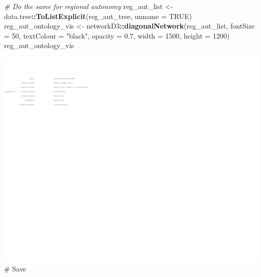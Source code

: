 \documentclass[
]{article}
\newenvironment{Shaded}{\begin{snugshade}}{\end{snugshade}}
\newcommand{\CommentTok}[1]{\textcolor[rgb]{0.56,0.35,0.01}{\textit{#1}}}
\newcommand{\DataTypeTok}[1]{\textcolor[rgb]{0.13,0.29,0.53}{#1}}
\newcommand{\DecValTok}[1]{\textcolor[rgb]{0.00,0.00,0.81}{#1}}
\newcommand{\FloatTok}[1]{\textcolor[rgb]{0.00,0.00,0.81}{#1}}
\newcommand{\KeywordTok}[1]{\textcolor[rgb]{0.13,0.29,0.53}{\textbf{#1}}}
\newcommand{\NormalTok}[1]{#1}
\newcommand{\OperatorTok}[1]{\textcolor[rgb]{0.81,0.36,0.00}{\textbf{#1}}}
\newcommand{\OtherTok}[1]{\textcolor[rgb]{0.56,0.35,0.01}{#1}}
\newcommand{\StringTok}[1]{\textcolor[rgb]{0.31,0.60,0.02}{#1}}
\begin{document}
\begin{Shaded}
\begin{Highlighting}[]
\CommentTok{# Do the same for regional autonomy}
\NormalTok{reg_aut_list <-}\StringTok{ }\NormalTok{data.tree}\OperatorTok{::}\KeywordTok{ToListExplicit}\NormalTok{(reg_aut_tree, }\DataTypeTok{unname =} \OtherTok{TRUE}\NormalTok{)}
\NormalTok{reg_aut_ontology_vis <-}\StringTok{ }\NormalTok{networkD3}\OperatorTok{::}\KeywordTok{diagonalNetwork}\NormalTok{(reg_aut_list, }
                         \DataTypeTok{fontSize =} \DecValTok{50}\NormalTok{,}
                         \DataTypeTok{textColour =} \StringTok{"black"}\NormalTok{,}
                         \DataTypeTok{opacity =} \FloatTok{0.7}\NormalTok{,}
                         \DataTypeTok{width =} \DecValTok{1500}\NormalTok{,}
                         \DataTypeTok{height =} \DecValTok{1200}\NormalTok{)}
\NormalTok{reg_aut_ontology_vis}
\end{Highlighting}
\end{Shaded}

\includegraphics{04_tjbrailey_ontology_vis_files/figure-latex/unnamed-chunk-3-2.pdf}
\# Save
\end{document}
